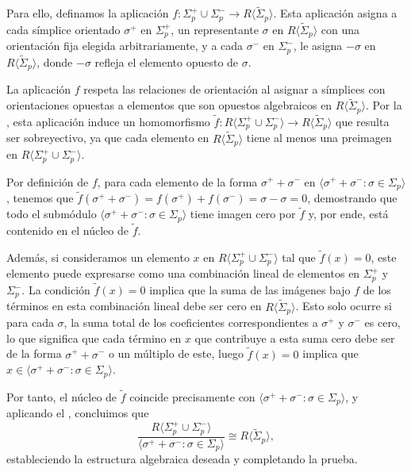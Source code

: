Para ello, definamos la aplicación
$f : \Sigma^{+}_{p}\cup \Sigma^{-}_{p}\to R \langle \tilde{\Sigma}_{p}\rangle$. Esta
aplicación asigna a cada símplice orientado $\sigma^{+}$ en $\Sigma_{p}^{+}$, un
representante $\sigma$ en $R \langle \tilde{\Sigma}_{p}\rangle$ con una
orientación fija elegida arbitrariamente, y a cada $\sigma^{-}$ en $\Sigma_{p}^{-}$,
le asigna $-\sigma$ en $R \langle \tilde{\Sigma}_{p}\rangle$, donde $-\sigma$ refleja
el elemento opuesto de $\sigma$.

La aplicación $f$ respeta las relaciones de orientación al asignar a símplices con
orientaciones opuestas a elementos que son opuestos algebraicos en $R \langle \tilde
{\Sigma}_{p}\rangle$. Por la , esta aplicación
induce un homomorfismo
$\tilde{f}: R\langle \Sigma_{p}^{+}\cup \Sigma_{p}^{-}\rangle \to R \langle \tilde
{\Sigma}_{p}\rangle$
que resulta ser sobreyectivo, ya que cada elemento en $R \langle \tilde{\Sigma}_{p}
\rangle$ tiene al menos una preimagen en $R\langle \Sigma_{p}^{+}\cup \Sigma_{p}^{-}
\rangle$.

Por definición de $f$, para cada elemento de la forma $\sigma^{+}+ \sigma^{-}$
en $\langle \sigma^{+}+ \sigma^{-}: \sigma \in \Sigma_{p}\rangle$, tenemos que $\tilde
{f}(\sigma^{+}+ \sigma^{-}) = f(\sigma^{+}) + f(\sigma^{-}) = \sigma - \sigma = 0$,
demostrando que todo el submódulo
$\langle \sigma^{+}+ \sigma^{-}: \sigma \in \Sigma_{p}\rangle$ tiene imagen cero
por $\tilde{f}$ y, por ende, está contenido en el núcleo de $\tilde{f}$.

Además, si consideramos un elemento $x$ en $R\langle \Sigma_{p}^{+}\cup \Sigma_{p}
^{-}\rangle$ tal que $\tilde{f}(x) = 0$, este elemento puede expresarse como una
combinación lineal de elementos en $\Sigma_{p}^{+}$ y $\Sigma_{p}^{-}$. La condición
$\tilde{f}(x) = 0$ implica que la suma de las imágenes bajo $f$ de los términos en
esta combinación lineal debe ser cero en $R \langle \tilde{\Sigma}_{p}\rangle$.
Esto solo ocurre si para cada $\sigma$, la suma total de los coeficientes correspondientes
a $\sigma^{+}$ y $\sigma^{-}$ es cero, lo que significa que cada término en $x$
que contribuye a esta suma cero debe ser de la forma $\sigma^{+}+ \sigma^{-}$ o
un múltiplo de este, luego $\tilde{f}(x) = 0$ implica que $x \in \langle \sigma^{+}
+ \sigma^{-}: \sigma \in \Sigma_{p}\rangle$.

Por tanto, el núcleo de $\tilde{f}$ coincide precisamente con
$\langle \sigma^{+}+ \sigma^{-}: \sigma \in \Sigma_{p}\rangle$, y aplicando el ,
concluimos que
\[
\frac{R\langle \Sigma_{p}^{+}\cup \Sigma_{p}^{-}\rangle}{\langle \sigma^{+}+
	\sigma^{-}: \sigma \in \Sigma_{p}\rangle}\cong R \langle \tilde{\Sigma}_{p}\rangle
,
\]
estableciendo la estructura algebraica deseada y completando la prueba.

